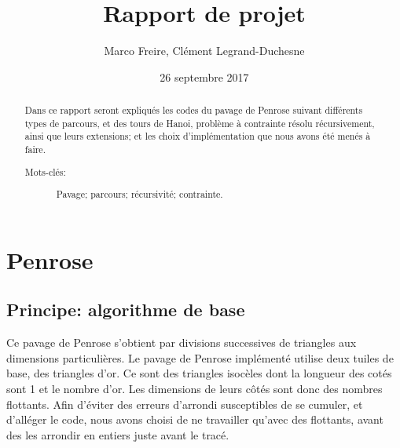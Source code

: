 \documentclass[a4paper, 11pt]{article}%
\begin{document}
\title{Rapport de projet}

\author{Marco Freire, Clément Legrand-Duchesne}

\date{26 septembre 2017}

\maketitle

\begin{abstract}
  Dans ce rapport seront expliqués les codes du pavage de Penrose
  suivant différents types de parcours, et des tours de Hanoi, problème
  à contrainte résolu récursivement, ainsi que leurs extensions; et les
  choix d'implémentation que nous avons été menés à faire.
  \begin{description}
    
  \item[Mots-clés:] Pavage; parcours; récursivité; contrainte.

   

  \end{description}
\end{abstract}


\section{Penrose}
        \subsection{Principe: algorithme de base}
                Ce pavage de Penrose s'obtient par divisions
                successives de triangles aux dimensions particulières. 
                Le pavage de Penrose implémenté utilise deux tuiles de
                base, des triangles d'or. Ce sont des triangles
                isocèles dont la longueur des cotés sont 1 et le
                nombre d'or. 
                Les dimensions de leurs
                côtés sont donc des nombres flottants. Afin
                d'éviter des erreurs d'arrondi susceptibles de se
                cumuler, et d'alléger le code, nous avons choisi de ne
                travailler qu'avec des flottants, avant des les
                arrondir en entiers juste avant le tracé.
                
\end{document}
